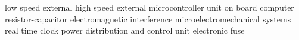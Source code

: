      {low speed external}
     {high speed external}
     {microcontroller unit}
     {on board computer}
      {resistor-capacitor}
     {electromagnetic interference}
    {microelectromechanical systems}
     {real time clock}
    {power distribution and control unit}
   {electronic fuse}